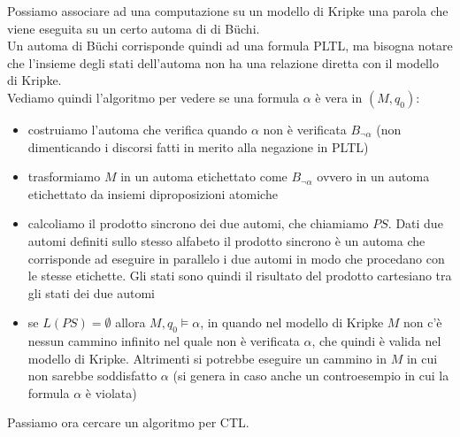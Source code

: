 Possiamo associare ad una computazione su un modello di Kripke una parola che
viene eseguita su un certo automa di di B\"{u}chi.\\
Un automa di B\"{u}chi corrisponde quindi ad una formula PLTL, ma bisogna notare
che l'insieme degli stati dell'automa non ha una relazione diretta con il
modello di Kripke.\\
Vediamo quindi l'algoritmo per vedere se una formula $\alpha$ è vera in
$(M, q_0)$:
\begin{itemize}
  \item costruiamo l'automa che verifica quando $\alpha$ non è verificata
  $B_{\neg\alpha}$ (non dimenticando i discorsi fatti in merito alla negazione
  in PLTL)
  \item trasformiamo $M$ in un automa etichettato come $B_{\neg\alpha}$ ovvero
  in un automa etichettato da insiemi diproposizioni atomiche 
  \item calcoliamo il prodotto sincrono dei due automi, che chiamiamo $PS$. Dati
  due automi definiti sullo stesso alfabeto il prodotto sincrono è un automa che
  corrisponde ad eseguire in parallelo i due automi in modo che procedano con le
  stesse etichette. Gli stati sono quindi il risultato del prodotto cartesiano
  tra gli stati dei due automi
  \item se $L(PS)=\emptyset$ allora $M, q_0\vDash\alpha$, in quando nel modello
  di Kripke $M$ non c'è nessun cammino infinito nel quale non è verificata
  $\alpha$, che quindi è valida nel modello di Kripke. Altrimenti si potrebbe
  eseguire un cammino in $M$ in cui non sarebbe soddisfatto $\alpha$ (si genera
  in caso anche un controesempio in cui la formula $\alpha$ è violata)
\end{itemize}
Passiamo ora cercare un algoritmo per CTL.
